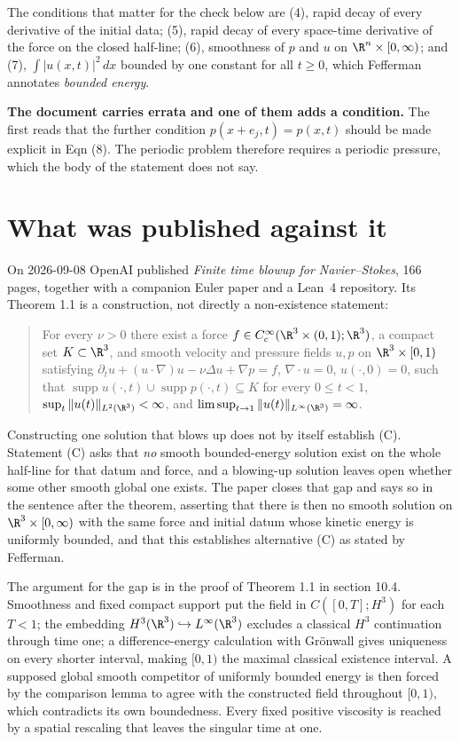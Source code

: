 The conditions that matter for the check below are (4), rapid decay of every derivative of the
initial data; (5), rapid decay of every space-time derivative of the force on the closed half-line;
(6), smoothness of $p$ and $u$ on $\R^n\times[0,\infty)$; and (7), $\int|u(x,t)|^2\,dx$ bounded by
one constant for all $t\ge0$, which Fefferman annotates \emph{bounded energy}.

\textbf{The document carries errata and one of them adds a condition.} The first reads that the further
condition $p(x+e_j,t)=p(x,t)$ should be made explicit in Eqn (8). The periodic problem therefore
requires a periodic pressure, which the body of the statement does not say.

\section{What was published against it}

On 2026-09-08 OpenAI published \emph{Finite time blowup for Navier--Stokes}, 166 pages, together
with a companion Euler paper and a Lean~4 repository. Its Theorem 1.1 is a construction, not
directly a non-existence statement:

\begin{quote}
For every $\nu>0$ there exist a force $f \in C_c^\infty(\R^3\times(0,1);\R^3)$, a compact set
$K\subset\R^3$, and smooth velocity and pressure fields $u,p$ on $\R^3\times[0,1)$ satisfying
$\partial_t u + (u\cdot\nabla)u - \nu\Delta u + \nabla p = f$, $\nabla\cdot u = 0$,
$u(\cdot,0)=0$, such that $\operatorname{supp} u(\cdot,t)\cup\operatorname{supp}p(\cdot,t)\subseteq
K$ for every $0\le t<1$, $\sup_t \|u(t)\|_{L^2(\R^3)} < \infty$, and
$\limsup_{t\to1}\|u(t)\|_{L^\infty(\R^3)} = \infty$.
\end{quote}

Constructing one solution that blows up does not by itself establish (C). Statement (C) asks that
\emph{no} smooth bounded-energy solution exist on the whole half-line for that datum and force, and
a blowing-up solution leaves open whether some other smooth global one exists. The paper closes
that gap and says so in the sentence after the theorem, asserting that there is then no smooth
solution on $\R^3\times[0,\infty)$ with the same force and initial datum whose kinetic
energy is uniformly bounded, and that this establishes alternative (C) as stated by Fefferman.

The argument for the gap is in the proof of Theorem 1.1 in section 10.4. Smoothness and fixed
compact support put the field in $C([0,T];H^3)$ for each $T<1$; the embedding
$H^3(\R^3)\hookrightarrow L^\infty(\R^3)$ excludes a classical $H^3$ continuation through time one;
a difference-energy calculation with Gr\"onwall gives uniqueness on every shorter interval, making
$[0,1)$ the maximal classical existence interval. A supposed global smooth competitor of uniformly
bounded energy is then forced by the comparison lemma to agree with the constructed field
throughout $[0,1)$, which contradicts its own boundedness. Every fixed positive viscosity is
reached by a spatial rescaling that leaves the singular time at one.

